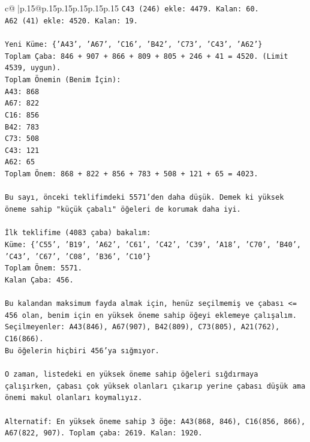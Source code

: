 \documentclass{article}
\begin{document}
{\begin{supertabular}{c@{$\;$}|p{.15\linewidth}@{}p{.15\linewidth}p{.15\linewidth}p{.15\linewidth}p{.15\linewidth}p{.15\linewidth}}
{{{\texttt{C43 (246) ekle: 4479. Kalan: 60.} \\
\texttt{A62 (41) ekle: 4520. Kalan: 19.} \\
\\ 
\texttt{Yeni Küme: \{'A43', 'A67', 'C16', 'B42', 'C73', 'C43', 'A62'\}} \\
\texttt{Toplam Çaba: 846 + 907 + 866 + 809 + 805 + 246 + 41 = 4520. (Limit 4539, uygun).} \\
\texttt{Toplam Önemin (Benim İçin):} \\
\texttt{A43: 868} \\
\texttt{A67: 822} \\
\texttt{C16: 856} \\
\texttt{B42: 783} \\
\texttt{C73: 508} \\
\texttt{C43: 121} \\
\texttt{A62: 65} \\
\texttt{Toplam Önem: 868 + 822 + 856 + 783 + 508 + 121 + 65 = 4023.} \\
\\ 
\texttt{Bu sayı, önceki teklifimdeki 5571'den daha düşük. Demek ki yüksek öneme sahip "küçük çabalı" öğeleri de korumak daha iyi.} \\
\\ 
\texttt{İlk teklifime (4083 çaba) bakalım:} \\
\texttt{Küme: \{'C55', 'B19', 'A62', 'C61', 'C42', 'C39', 'A18', 'C70', 'B40', 'C43', 'C67', 'C08', 'B36', 'C10'\}} \\
\texttt{Toplam Önem: 5571.} \\
\texttt{Kalan Çaba: 456.} \\
\\ 
\texttt{Bu kalandan maksimum fayda almak için, henüz seçilmemiş ve çabası <= 456 olan, benim için en yüksek öneme sahip öğeyi eklemeye çalışalım.} \\
\texttt{Seçilmeyenler: A43(846), A67(907), B42(809), C73(805), A21(762), C16(866).} \\
\texttt{Bu öğelerin hiçbiri 456'ya sığmıyor.} \\
\\ 
\texttt{O zaman, listedeki en yüksek öneme sahip öğeleri sığdırmaya çalışırken, çabası çok yüksek olanları çıkarıp yerine çabası düşük ama önemi makul olanları koymalıyız.} \\
\\ 
\texttt{Alternatif: En yüksek öneme sahip 3 öğe: A43(868, 846), C16(856, 866), A67(822, 907). Toplam çaba: 2619. Kalan: 1920.} \\
}}}
\end{supertabular}}
\end{document}
